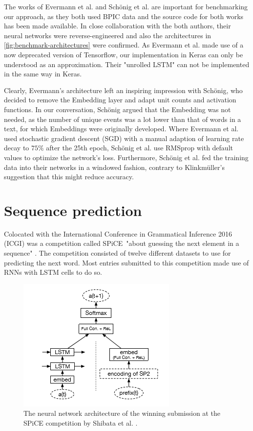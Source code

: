 The works of Evermann et al. and Schönig et al. are important for benchmarking our approach, as they both used BPIC data and the source code for both works has been made available. In close collaboration with the both authors, their neural networks were reverse-engineered and also the architectures in \autoref{fig:benchmark-architectures} were confirmed. As Evermann et al. made use of a now deprecated version of Tensorflow, our implementation in Keras can only be understood as an approximation. Their "unrolled LSTM" can not be implemented in the same way in Keras.

Clearly, Evermann's architecture left an inspiring impression with Schönig, who decided to remove the Embedding layer and adapt unit counts and activation functions. In our conversation, Schönig argued that the Embedding was not needed, as the number of unique events was a lot lower than that of words in a text, for which Embeddings were originally developed. Where Evermann et al. used stochastic gradient descent (SGD) with a manual adaption of learning rate decay to $75\%$ after the 25th epoch, Schönig et al. use RMSprop with default values to optimize the network's loss. Furthermore, Schönig et al. fed the training data into their networks in a windowed fashion, contrary to Klinkmüller's suggestion that this might reduce accuracy.

\section{Sequence prediction}
\label{sec:related-work-sequence-prediction}
Colocated with the International Conference in Grammatical Inference 2016 (ICGI) was a competition called SPiCE\ "about guessing the next element in a sequence" \cite{web:spice}. The competition consisted of twelve different datasets to use for predicting the next word. Most entries submitted to this competition made use of RNNs with LSTM cells to do so.\\

\begin{figure}
    \centering
    \includegraphics[height=.4\textwidth]{gfx/spice-winner-architecture.png}
    \caption{The neural network architecture of the winning submission at the SPiCE competition by Shibata et al. \cite{shibata2016bipartite}.}
    \label{fig:spice-winner-architecture}
\end{figure}


